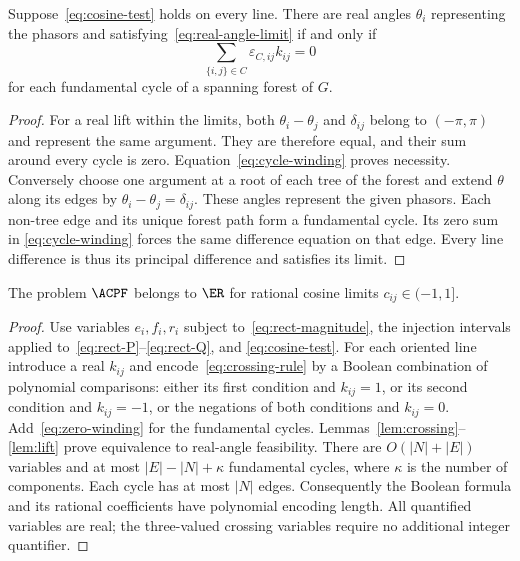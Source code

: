 \begin{lemma}
\label{lem:lift}
Suppose~\eqref{eq:cosine-test} holds on every line. There are real angles
$\theta_i$ representing the phasors and satisfying~\eqref{eq:real-angle-limit}
if and only if
\begin{equation}
 \sum_{\{i,j\}\in C}\varepsilon_{C,ij}k_{ij}=0
 \label{eq:zero-winding}
\end{equation}
for each fundamental cycle of a spanning forest of $G$.
\end{lemma}
\begin{proof}
For a real lift within the limits, both $\theta_i-\theta_j$ and
$\delta_{ij}$ belong to $(-\pi,\pi)$ and represent the same argument.
They are therefore equal, and their sum around every cycle is zero.
Equation~\eqref{eq:cycle-winding} proves necessity.
Conversely choose one argument at a root of each tree of the forest and
extend $\theta$ along its edges by $\theta_i-\theta_j=\delta_{ij}$.
These angles represent the given phasors. Each non-tree edge and its
unique forest path form a fundamental cycle. Its zero sum in
\eqref{eq:cycle-winding} forces the same difference equation on that edge.
Every line difference is thus its principal difference and satisfies its limit.
\end{proof}

\begin{theorem}
\label{thm:ac-membership}
The problem $\ACPF$ belongs to $\ER$ for rational cosine limits
$c_{ij}\in(-1,1]$.
\end{theorem}
\begin{proof}
Use variables $e_i,f_i,r_i$ subject to~\eqref{eq:rect-magnitude}, the injection
intervals applied to~\eqref{eq:rect-P}--\eqref{eq:rect-Q}, and
\eqref{eq:cosine-test}. For each oriented line introduce a real $k_{ij}$ and
encode~\eqref{eq:crossing-rule} by a Boolean combination of polynomial
comparisons: either its first condition and $k_{ij}=1$, or its second
condition and $k_{ij}=-1$, or the negations of both conditions and $k_{ij}=0$.
Add~\eqref{eq:zero-winding} for the fundamental cycles.
Lemmas~\ref{lem:crossing}--\ref{lem:lift} prove equivalence to real-angle
feasibility. There are $O(|N|+|E|)$ variables and at most
$|E|-|N|+\kappa$ fundamental cycles, where $\kappa$ is the number of
components. Each cycle has at most $|N|$ edges. Consequently the Boolean
formula and its rational coefficients have polynomial encoding length.
All quantified variables are real; the three-valued crossing variables
require no additional integer quantifier.
\end{proof}

